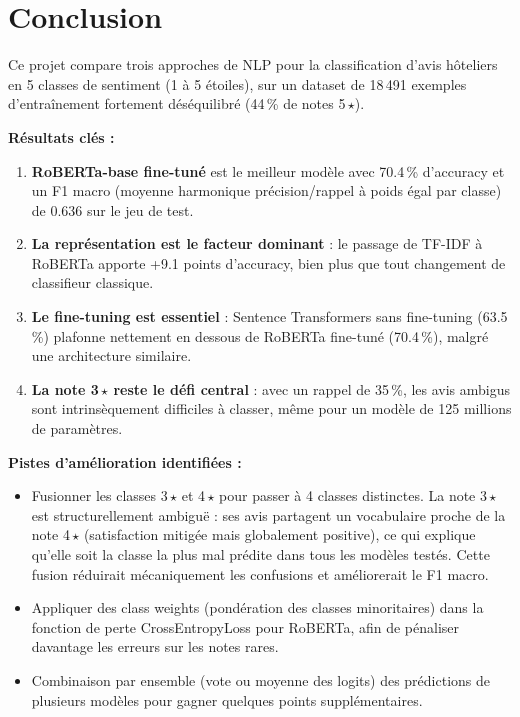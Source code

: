 \documentclass[12pt, a4paper]{article}
\begin{document}
\section*{Conclusion}

Ce projet compare trois approches de NLP pour la classification d'avis hôteliers
en 5 classes de sentiment (1 à 5 étoiles), sur un dataset de 18\,491 exemples
d'entraînement fortement déséquilibré (44\,\% de notes 5\,$\star$).

\textbf{Résultats clés :}
\begin{enumerate}
  \item \textbf{RoBERTa-base fine-tuné} est le meilleur modèle avec 70.4\,\%
        d'accuracy et un F1 macro (moyenne harmonique précision/rappel à poids égal
        par classe) de 0.636 sur le jeu de test.
  \item \textbf{La représentation est le facteur dominant} : le passage de TF-IDF
        à RoBERTa apporte +9.1 points d'accuracy, bien plus que tout changement
        de classifieur classique.
  \item \textbf{Le fine-tuning est essentiel} : Sentence Transformers sans fine-tuning
        (63.5\,\%) plafonne nettement en dessous de RoBERTa fine-tuné (70.4\,\%),
        malgré une architecture similaire.
  \item \textbf{La note 3\,$\star$ reste le défi central} : avec un rappel de 35\,\%,
        les avis ambigus sont intrinsèquement difficiles à classer, même pour un modèle
        de 125 millions de paramètres.
\end{enumerate}

\textbf{Pistes d'amélioration identifiées :}
\begin{itemize}
  \item Fusionner les classes 3\,$\star$ et 4\,$\star$ pour passer à 4 classes distinctes.
        La note 3\,$\star$ est structurellement ambiguë : ses avis partagent un vocabulaire
        proche de la note 4\,$\star$ (satisfaction mitigée mais globalement positive),
        ce qui explique qu'elle soit la classe la plus mal prédite dans tous les modèles testés.
        Cette fusion réduirait mécaniquement les confusions et améliorerait le F1 macro.
  \item Appliquer des class weights (pondération des classes minoritaires) dans la
        fonction de perte CrossEntropyLoss pour RoBERTa, afin de pénaliser davantage
        les erreurs sur les notes rares.
  \item Combinaison par ensemble (vote ou moyenne des logits) des prédictions de
        plusieurs modèles pour gagner quelques points supplémentaires.
\end{itemize}
\end{document}

